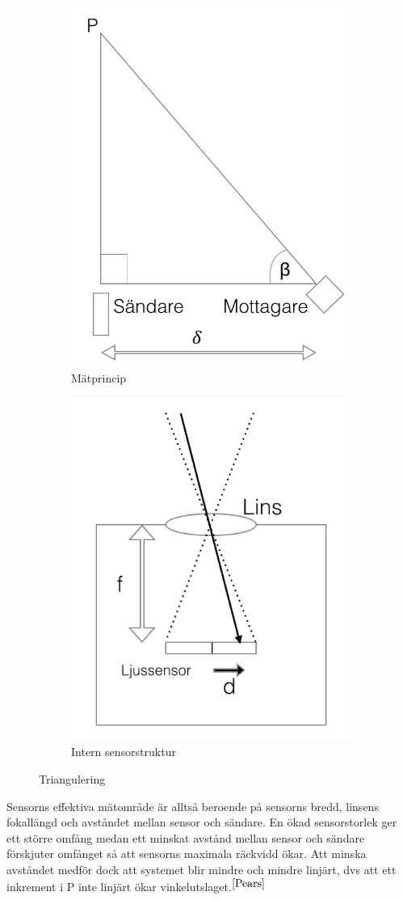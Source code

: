 \documentclass[a4paper,12pt,fleqn]{article}
\begin{document}
\begin{figure}
\centering
\begin{subfigure}{.5\textwidth}
  \centering
  \includegraphics[width=.5\linewidth]{Traingulering001.jpg}
  \caption{Mätprincip}
  \label{fig:sub1}
\end{subfigure}%
\begin{subfigure}{.5\textwidth}
  \centering
  \includegraphics[width=.5\linewidth]{Traingulering002.jpg}
  \caption{Intern sensorstruktur}
  \label{fig:sub2}
\end{subfigure}
\caption{Triangulering}
\label{fig:sub}
\end{figure}



Sensorns effektiva mätområde är alltså beroende på sensorns bredd, linsens fokallängd och avståndet mellan sensor och sändare.
En ökad sensorstorlek ger ett större omfång medan ett minskat avstånd mellan sensor och sändare förskjuter omfånget så att sensorns maximala räckvidd ökar. Att minska avståndet medför dock att systemet blir mindre och mindre linjärt, dvs att ett inkrement i P inte linjärt ökar vinkelutslaget.$^{\ref{Pears}}$
\end{document}
